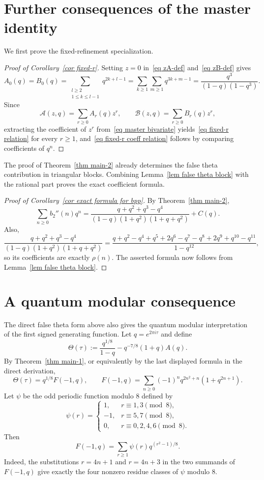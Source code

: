 \documentclass[10pt,a4paper]{amsart}
\numberwithin{equation}{section}
\begin{document}
\section{Further consequences of the master identity}\label{sec proofs corollaries}
%
We first prove the fixed-refinement specialization.
\begin{proof}[Proof of Corollary~\ref{cor fixed-r}]
Setting $z=0$ in~\eqref{eq zA-def} and~\eqref{eq zB-def} gives
\[
A_0(q)=B_0(q)=\sum_{\substack{l\ge 2\\1\le k\le l-1}} q^{2k+l-1}
=\sum_{k\ge 1}\sum_{m\ge 1} q^{3k+m-1}
=\frac{q^3}{(1-q)(1-q^3)}.
\]
Since
\[
\mathcal A(z,q)=\sum_{r\ge 0}A_r(q)z^r,\qquad \mathcal B(z,q)=\sum_{r\ge 0}B_r(q)z^r,
\]
extracting the coefficient of $z^r$ from~\eqref{eq master bivariate} yields~\eqref{eq fixed-r relation} for every $r\ge 1$, and~\eqref{eq fixed-r coeff relation} follows by comparing coefficients of $q^n$.
\end{proof}

The proof of Theorem~\ref{thm main-2} already determines the false theta contribution in triangular blocks.  Combining Lemma~\ref{lem false theta block} with the rational part proves the exact coefficient formula.

\begin{proof}[Proof of Corollary~\ref{cor exact formula for bpp}]
By Theorem~\ref{thm main-2},
\[
\sum_{n\ge 0} b_2''(n)q^n
=\frac{q+q^2+q^3-q^4}{(1-q)(1+q^2)(1+q+q^2)} + C(q).
\]
Also,
\[
\frac{q+q^2+q^3-q^4}{(1-q)(1+q^2)(1+q+q^2)}
=\frac{q+q^2-q^4+q^5+2q^6-q^7-q^8+2q^9+q^{10}-q^{11}}{1-q^{12}},
\]
so its coefficients are exactly $\rho(n)$.  The asserted formula now follows from Lemma~\ref{lem false theta block}.
\end{proof}


\section{A quantum modular consequence}\label{sec quantum}

The direct false theta form above also gives the quantum modular interpretation of the first signed generating function.  Let $q=e^{2\pi i\tau}$ and define
\[
\Theta(\tau):=\frac{q^{1/8}}{1-q}-q^{-7/8}(1+q)A(q).
\]
By Theorem~\ref{thm main-1}, or equivalently by the last displayed formula in the direct derivation,
\begin{equation}\label{eq theta false theta}
\Theta(\tau)=q^{1/8}F(-1,q),\qquad
F(-1,q)=\sum_{n\ge0}(-1)^nq^{2n^2+n}(1+q^{2n+1}).
\end{equation}
Let $\psi$ be the odd periodic function modulo $8$ defined by
\[
\psi(r)=
\begin{cases}
1, & r\equiv 1,3\pmod 8,\\
-1, & r\equiv 5,7\pmod 8,\\
0, & r\equiv 0,2,4,6\pmod 8.
\end{cases}
\]
Then
\begin{equation}\label{eq psi false theta}
F(-1,q)=\sum_{r\ge1}\psi(r)q^{(r^2-1)/8}.
\end{equation}
Indeed, the substitutions $r=4n+1$ and $r=4n+3$ in the two summands of $F(-1,q)$ give exactly the four nonzero residue classes of $\psi$ modulo $8$.
\end{document}
